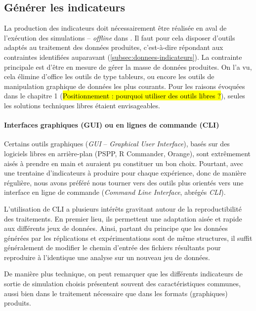 \subsection{Générer les indicateurs}

La production des indicateurs doit nécessairement être réalisée en aval de l'exécution des simulations -- \og \textit{offline}\fg{} dans \textcite{grignard_agent-based_2017}.
Il faut pour cela disposer d'outils adaptés au traitement des données produites, c'est-à-dire répondant aux contraintes identifiées auparavant (\autoref{subsec:donnees-indicateurs}).
La contrainte principale est d'être en mesure de gérer la masse de données produites.
On l'a vu, cela élimine d'office les outils de type tableurs, ou encore les outils de manipulation graphique de données les plus courants.
Pour les raisons évoquées dans le chapitre 1 (\hl{Positionnement : pourquoi utiliser des outils libres ?}), seules les solutions techniques libres étaient envisageables.

\paragraph{Interfaces graphiques (GUI) ou en lignes de commande (CLI)}
Certains outils graphiques (\textit{GUI} -- \textit{Graphical User Interface}), basés sur des logiciels libres en arrière-plan (PSPP, R Commander, Orange), sont extrêmement aisés à prendre en main et auraient pu constituer un bon choix.
Pourtant, avec une trentaine d'indicateurs à produire pour chaque expérience, donc de manière régulière, nous avons préféré nous tourner vers des outils plus orientés vers une interface en ligne de commande (\textit{Command Line Interface}, abrégés \textit{CLI}).

L'utilisation de CLI a plusieurs intérêts gravitant autour de la reproductibilité des traitements.
En premier lieu, ils permettent une adaptation aisée et rapide aux différents jeux de données.
Ainsi, partant du principe que les données générées par les réplications et expérimentations sont de même structures, il suffit généralement de modifier le chemin d'entrée des fichiers résultants pour reproduire à l'identique une analyse sur un nouveau jeu de données.

De manière plus technique, on peut remarquer que les différents indicateurs de sortie de simulation choisis présentent souvent des caractéristiques communes, aussi bien dans le traitement nécessaire que dans les formats (graphiques) produits.

